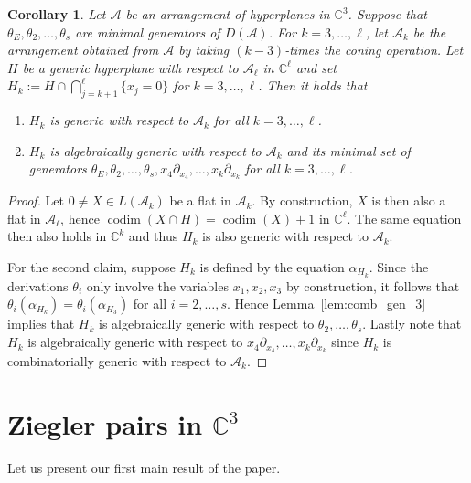\documentclass[a4paper,11pt]{amsart}
\def\CC{{\mathbb{C}}}%
\def\C{{\mathbb{C}}}%
\def\A{{\mathcal{A}}}%
\def\C{{\mathcal{C}}}%
\DeclareMathOperator{\codim}{codim}
\numberwithin{equation}{section}
\newtheorem{cor}[theorem]{Corollary}
\theoremstyle{remark}
\begin{document}
\begin{cor}\label{cor:generic}
	Let $\mathcal{A}$ be an arrangement of hyperplanes in $\CC^3$.
	Suppose that $\theta_E,\theta_2,\ldots,\theta_s$ are minimal generators of $D(\A)$.
	For $k=3,\dots,\ell$, let $\A_k$ be the arrangement obtained from $\A$ by taking $(k-3)$-times the coning operation.
	Let $H$ be a generic hyperplane with respect to $\A_\ell$ in $\mathbb{C}^\ell$ and set $H_k:= H \cap \bigcap_{j=k+1}^{\ell} \{x_j=0\}$ for $k=3,\dots,\ell$.
	Then it holds that
		\begin{enumerate}
			\item[(i)] $H_k$ is generic with respect to $\A_k$ for all $k=3,\dots,\ell$.
			\item[(ii)] $H_k$ is algebraically generic with respect to $\A_k$ and its minimal set of generators $\theta_E,\theta_2,\dots,\theta_s,x_4\partial_{x_4},\dots,x_k \partial_{x_k}$ for all $k=3,\dots,\ell$.
		\end{enumerate}
\end{cor}
\begin{proof}
	Let $0\neq X\in L(\A_k)$ be  a flat in $\A_k$.
	By construction, $X$ is then also a flat in $\A_\ell$, hence $\codim(X\cap H)=\codim(X)+1$ in $\CC^\ell$.
	The same equation then also holds in $\CC^k$ and thus $H_{k}$ is also generic with respect to $\A_k$.
	

	For the second claim, suppose $H_k$ is defined by the equation $\alpha_{H_k}$.
	Since the derivations $\theta_i$ only involve the variables $x_1,x_2,x_3$ by construction, it follows that $\theta_i(\alpha_{H_k})=\theta_i(\alpha_{H_3})$ for all $i=2,\dots,s$.
	Hence  Lemma~\ref{lem:comb_gen_3} implies that $H_k$ is algebraically generic with respect to $\theta_2,\dots,\theta_s$.
	Lastly note that  $H_k$ is algebraically generic with respect to $x_4\partial_{x_4},\dots,x_k \partial_{x_k}$ since $H_k$ is combinatorially generic with respect to $\A_k$.
\end{proof}

\section{Ziegler pairs in \texorpdfstring{$\mathbb{C}^{3}$}{}}\label{sec:dim3}
Let us present our first main result of the paper.
\end{document}
